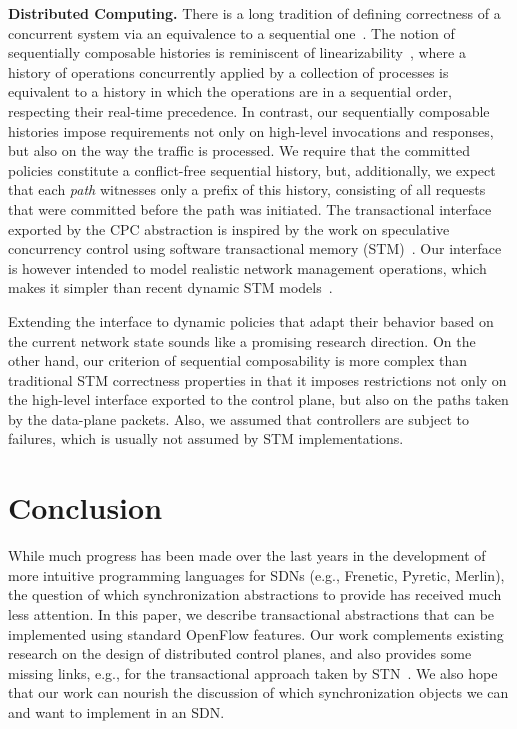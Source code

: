 \documentclass[conference]{sigcomm-alternate}
\begin{document}
{{\noindent\textbf{Distributed Computing.}
There is a long tradition of defining correctness of a concurrent system via
an equivalence to a sequential one~\cite{Pap79-serial,Lam79,HW90}.  The notion
of sequentially composable histories is reminiscent of
linearizability~\cite{HW90}, where a history of operations concurrently
applied by a collection of processes is equivalent to a history in which the
operations are in a sequential order, respecting their real-time precedence.
In contrast, our sequentially composable histories impose requirements not
only on high-level invocations and responses, but also on the way the traffic
is processed. We require that the committed policies constitute a
conflict-free sequential history, but, additionally,  we expect that each
\emph{path} witnesses only a prefix of this history, consisting of all
requests that were committed before the path was initiated.
%
The transactional interface exported by the CPC abstraction is inspired by the
work on speculative concurrency control using software transactional memory
(STM)~\cite{stm-st95}.
Our interface is however intended to model realistic network
management operations, which makes it simpler than recent
dynamic STM models~\cite{dstm}.

Extending the interface to dynamic policies that adapt their behavior based on
the current network state sounds like a promising research direction.  On the
other hand, our criterion of sequential composability is more complex than
traditional STM correctness properties in that it imposes restrictions not only
on the high-level interface exported to the control plane, but also on the
paths taken by the data-plane packets.
Also, we assumed that controllers are subject to failures, which is usually not
assumed by STM implementations.
}

\section{Conclusion}\label{sec:conclusion}

While much progress has been made over the
last years in the development of more intuitive programming
languages for SDNs (e.g., Frenetic, Pyretic, Merlin), the
question of which synchronization abstractions to provide
has received much less attention.
%
In this paper, we describe transactional abstractions that
can be implemented using standard OpenFlow features.
%
Our work complements existing research on the design of
distributed control planes, and also provides some missing links,
e.g., for the transactional approach taken by STN~\cite{stn}.
We also hope that our work can nourish the discussion of
which synchronization objects we can and want to implement
in an SDN.


}
\end{document}
